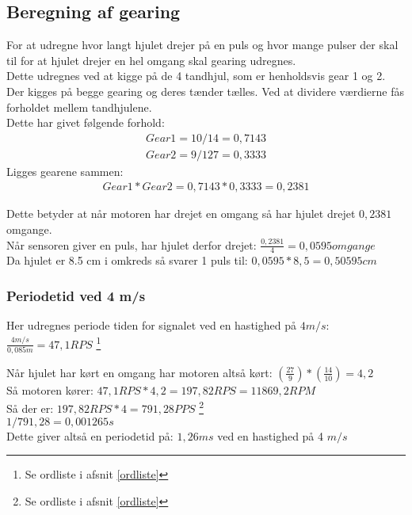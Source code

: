 \subsection{Beregning af gearing}
\label{beregn_gear}

For at udregne hvor langt hjulet drejer på en puls og hvor mange pulser der skal til for at hjulet drejer en hel omgang skal gearing udregnes. \\
Dette udregnes ved at kigge på de 4 tandhjul, som er henholdsvis gear 1 og 2. Der kigges på begge gearing og deres tænder tælles. Ved at dividere værdierne fås forholdet mellem tandhjulene. \\
Dette har givet følgende forhold:
\begin{align*}
Gear1 = 10 / 14 = 0,7143 \\
Gear2 = 9 / 127 = 0,3333
\end{align*}
Ligges gearene sammen:
\begin{align*}
Gear1*Gear2 = 0,7143 * 0,3333 = 0,2381
\end{align*}

Dette betyder at når motoren har drejet en omgang så har hjulet drejet \(0,2381\) omgange. \\
Når sensoren giver en puls, har hjulet derfor drejet: \(\frac{0,2381}{4} = 0,0595 omgange\) \\
Da hjulet er 8.5 cm i omkreds så svarer 1 puls til: \(0,0595*8,5 = 0,50595 cm\)

\subsubsection{Periodetid ved 4 m/s}
\label{periode_4ms}
Her udregnes periode tiden for signalet ved en hastighed på $4 m/s$:
$\frac{4m/s}{0,085m} = 47,1 RPS$ \footnote{Se ordliste i afsnit \ref{ordliste}}

Når hjulet har kørt en omgang har motoren altså kørt: $(\frac{27}{9}) * (\frac{14}{10}) = 4,2$ \\
Så motoren kører: \(47,1 RPS * 4,2 = 197,82 RPS = 11869,2 RPM \) \\
Så der er: \(197,82 RPS *4 = 791,28 PPS \) \footnote{Se ordliste i afsnit \ref{ordliste}} \\
\(1/791,28 = 0,001265 s \) \\
Dette giver altså en periodetid på: \(1,26 ms\) ved en hastighed på 4 $m/s$
